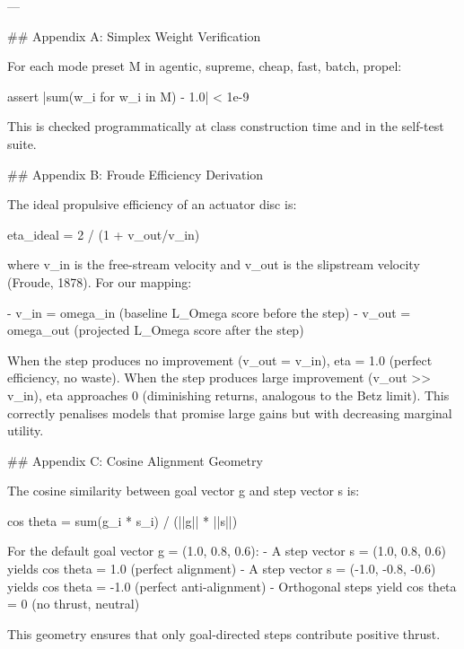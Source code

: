 ---

## Appendix A: Simplex Weight Verification

For each mode preset M in {agentic, supreme, cheap, fast, batch, propel}:

assert |sum(w_i for w_i in M) - 1.0| < 1e-9

This is checked programmatically at class construction time and in the self-test suite.

## Appendix B: Froude Efficiency Derivation

The ideal propulsive efficiency of an actuator disc is:

eta_ideal = 2 / (1 + v_out/v_in)

where v_in is the free-stream velocity and v_out is the slipstream velocity (Froude, 1878). For our mapping:

- v_in = omega_in (baseline L_Omega score before the step)
- v_out = omega_out (projected L_Omega score after the step)

When the step produces no improvement (v_out = v_in), eta = 1.0 (perfect efficiency, no waste). When the step produces large improvement (v_out >> v_in), eta approaches 0 (diminishing returns, analogous to the Betz limit). This correctly penalises models that promise large gains but with decreasing marginal utility.

## Appendix C: Cosine Alignment Geometry

The cosine similarity between goal vector g and step vector s is:

cos theta = sum(g_i * s_i) / (||g|| * ||s||)

For the default goal vector g = (1.0, 0.8, 0.6):
- A step vector s = (1.0, 0.8, 0.6) yields cos theta = 1.0 (perfect alignment)
- A step vector s = (-1.0, -0.8, -0.6) yields cos theta = -1.0 (perfect anti-alignment)
- Orthogonal steps yield cos theta = 0 (no thrust, neutral)

This geometry ensures that only goal-directed steps contribute positive thrust.
